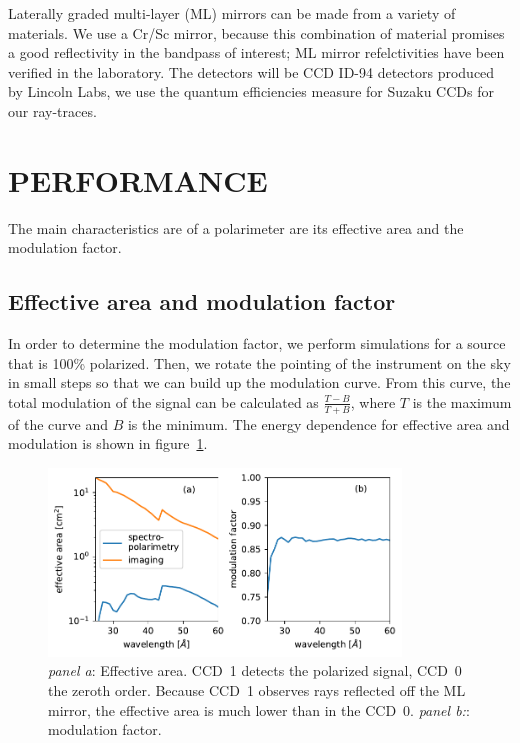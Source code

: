\documentclass[]{spie}  %
\begin{document}
Laterally graded multi-layer (ML) mirrors can be made from a variety
of materials. We use a Cr/Sc mirror, because this combination of
material promises a good reflectivity in the bandpass of interest; ML
mirror refelctivities have been verified in the
laboratory\cite{10.1117/12.2188452}. The detectors will be CCD ID-94
detectors produced by Lincoln Labs, we use the quantum efficiencies
measure for Suzaku CCDs\cite{2007PASJ...59S..23K} for our ray-traces.

\section{PERFORMANCE}
\label{sect:performance}
The main characteristics are of a polarimeter are its effective area and the modulation factor.

\subsection{Effective area and modulation factor}
In order to determine the modulation factor, we perform simulations
for a source that is 100\% polarized. Then, we rotate the pointing of
the instrument on the sky in small steps so that we can build up the
modulation curve. From this curve, the total modulation of the signal
can be calculated as $\frac{T-B}{T + B}$, where $T$ is the maximum of
the curve and $B$ is the minimum. The energy dependence for effective
area and modulation is shown in figure~\ref{fig:aeff}.
\begin{figure} [ht]
  \begin{center}
    \includegraphics[height=5cm]{aeff.pdf}
  \end{center}
  \caption
      { \label{fig:aeff} \emph{panel a}: Effective area. CCD~1 detects
        the polarized signal, CCD~0 the zeroth order. Because CCD~1
        observes rays reflected off the ML mirror, the effective area
        is much lower than in the CCD~0. \emph{panel b:}: modulation
        factor.  }
\end{figure}
\end{document}
